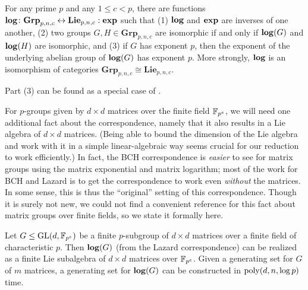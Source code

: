 \documentclass[11pt]{article}
\begin{document}
\begin{theorem} \label{thm:lazard}
For any prime $p$ and any $1 \leq c < p$, there are functions $\mathbf{log} \colon \mathbf{Grp}_{p,n,c} \leftrightarrow \mathbf{Lie}_{p,n,c} : \mathbf{exp}$ such that (1) $\mathbf{log}$ and $\mathbf{exp}$ are inverses of one another, (2) two groups $G,H \in \mathbf{Grp}_{p,n,c}$ are isomorphic if and only if $\mathbf{log}(G)$ and $\mathbf{log}(H)$ are isomorphic, and (3) if $G$ has exponent $p$, then the exponent of the underlying abelian group of $\mathbf{log}(G)$ has exponent $p$. More strongly, $\mathbf{log}$ is an isomorphism of categories $\mathbf{Grp}_{p,n,c} \cong \mathbf{Lie}_{p,n,c}$. 
\end{theorem}

Part (3) can be found as a special case of \cite[Lemma~6.1.2]{naik}.

For $p$-groups given by $d \times d$ matrices over the finite field $\mathbb{F}_{p^e}$, we will need one additional fact about the correspondence, namely that it also results in a Lie algebra of $d \times d$ matrices. (Being able to bound the dimension of the Lie algebra and work with it in a simple linear-algebraic way 
seems crucial for our reduction to work efficiently.) In fact, the BCH correspondence is \emph{easier} to see for matrix groups using the matrix exponential and matrix logarithm; most of the work for BCH and Lazard is to get the correspondence to work even \emph{without} the matrices. In some sense, this is thus the ``original'' setting of this correspondence. Though it is surely not new, we could not find a convenient reference for this fact about matrix groups over finite fields, so we state it formally here.

\begin{proposition} \label{prop:lazard_matrices}
Let $G \leq \mathrm{GL}(d,\mathbb{F}_{p^e})$ be a finite $p$-subgroup of $d \times d$ matrices 
over a finite field of characteristic $p$. Then $\mathbf{log}(G)$ (from the Lazard 
correspondence) can be realized as a finite Lie subalgebra of $d \times d$ 
matrices over $\mathbb{F}_{p^e}$. Given a generating set for $G$ of $m$ matrices, a generating set for $\mathbf{log}(G)$ can be constructed in $\mathrm{poly}(d,n,\log p)$ time.
\end{proposition}
\end{document}
